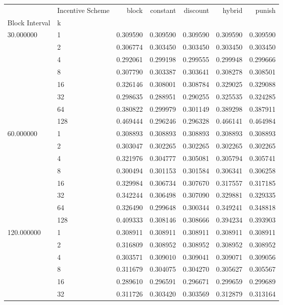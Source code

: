 \begin{tabular}{llrrrrr}
 & Incentive Scheme & block & constant & discount & hybrid & punish \\
Block Interval & k &  &  &  &  &  \\
\multirow[c]{8}{*}{30.000000} & 1 & 0.309590 & 0.309590 & 0.309590 & 0.309590 & 0.309590 \\
 & 2 & 0.306774 & 0.303450 & 0.303450 & 0.303450 & 0.303450 \\
 & 4 & 0.292061 & 0.299198 & 0.299555 & 0.299948 & 0.299666 \\
 & 8 & 0.307790 & 0.303387 & 0.303641 & 0.308278 & 0.308501 \\
 & 16 & 0.326146 & 0.308001 & 0.308784 & 0.329025 & 0.329088 \\
 & 32 & 0.298635 & 0.288951 & 0.290255 & 0.325535 & 0.324285 \\
 & 64 & 0.380822 & 0.299979 & 0.301149 & 0.389298 & 0.387911 \\
 & 128 & 0.469444 & 0.296246 & 0.296328 & 0.466141 & 0.464984 \\
\multirow[c]{8}{*}{60.000000} & 1 & 0.308893 & 0.308893 & 0.308893 & 0.308893 & 0.308893 \\
 & 2 & 0.303047 & 0.302265 & 0.302265 & 0.302265 & 0.302265 \\
 & 4 & 0.321976 & 0.304777 & 0.305081 & 0.305794 & 0.305741 \\
 & 8 & 0.300494 & 0.301153 & 0.301584 & 0.306341 & 0.306258 \\
 & 16 & 0.329984 & 0.306734 & 0.307670 & 0.317557 & 0.317185 \\
 & 32 & 0.342244 & 0.306498 & 0.307090 & 0.329881 & 0.329335 \\
 & 64 & 0.326490 & 0.299648 & 0.300344 & 0.349241 & 0.348818 \\
 & 128 & 0.409333 & 0.308146 & 0.308666 & 0.394234 & 0.393903 \\
\multirow[c]{8}{*}{120.000000} & 1 & 0.308911 & 0.308911 & 0.308911 & 0.308911 & 0.308911 \\
 & 2 & 0.316809 & 0.308952 & 0.308952 & 0.308952 & 0.308952 \\
 & 4 & 0.303571 & 0.309010 & 0.309041 & 0.309071 & 0.309056 \\
 & 8 & 0.311679 & 0.304075 & 0.304270 & 0.305627 & 0.305567 \\
 & 16 & 0.289610 & 0.296591 & 0.296671 & 0.299659 & 0.299689 \\
 & 32 & 0.311726 & 0.303420 & 0.303569 & 0.312879 & 0.313164 \\

\end{tabular}
